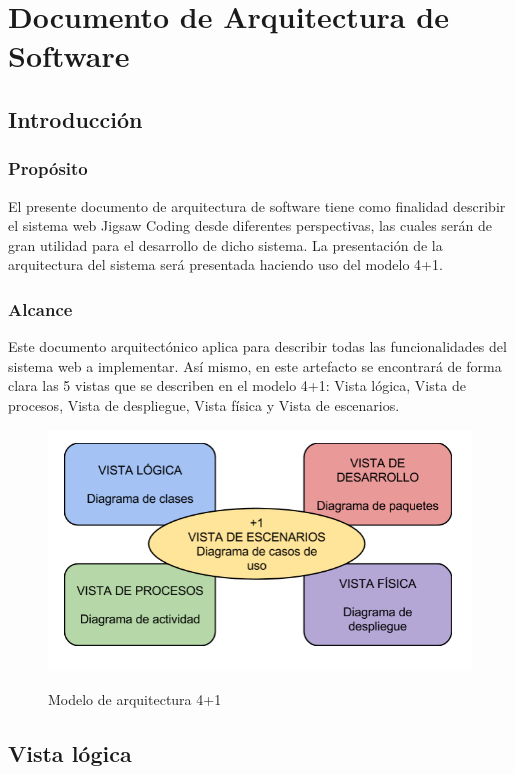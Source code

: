 \chapter{Documento de Arquitectura de Software}
\section{Introducción}
\subsection{Propósito}
El presente documento de arquitectura de software tiene como finalidad describir el sistema web Jigsaw Coding desde diferentes perspectivas, las cuales serán de gran utilidad para el desarrollo de dicho sistema. La presentación de la arquitectura del sistema será presentada haciendo uso del modelo 4+1.
\subsection{Alcance} Este documento arquitectónico aplica para describir todas las funcionalidades del sistema web a implementar. Así mismo, en este artefacto se encontrará de forma clara las 5 vistas que se describen en el modelo 4+1: Vista lógica, Vista de procesos, Vista de despliegue, Vista física y Vista de escenarios.
\begin{figure}[!h]
  \centering
  \includegraphics[scale=0.7]{figuras/sad/vista_4_mas_1.png}\\
  \caption{Modelo de arquitectura 4+1}
  \label{fig:vista_4_mas_1}
\end{figure} 
\clearpage
\section{Vista lógica}
\clearpage 
